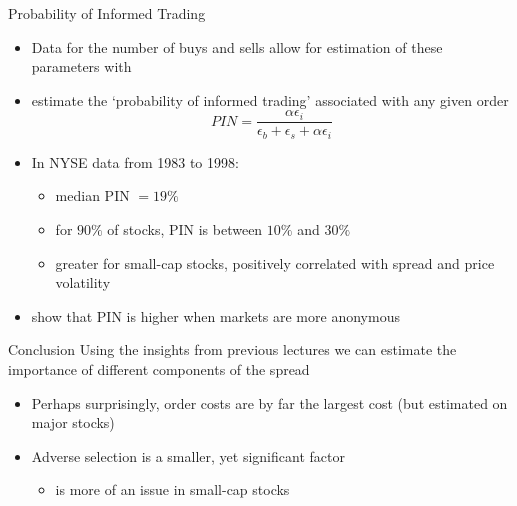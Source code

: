 \documentclass[english,10pt
,aspectratio=169
]{beamer}
\begin{document}
\begin{frame}{Probability of Informed Trading}
	\begin{itemize}
		\item Data for the number of buys and sells allow for estimation of these parameters with 
		\item \textbf{\citet*{easley_is_2002}} estimate the `probability of informed trading' associated with any given order
		\begin{equation} \tag{5.27}
		PIN = \frac{\alpha \epsilon_i}{\epsilon_b + \epsilon_s + \alpha \epsilon_i}
		\end{equation}
		\item In NYSE data from 1983 to 1998:
		\begin{itemize}
			\item median PIN $=19\%$
			\item for $90\%$ of stocks, PIN is between $10\%$ and $30\%$
			\item greater for small-cap stocks, positively correlated with spread and price volatility
		\end{itemize}
		\item \textbf{\citet*{grammig_knowing_2001}} show that PIN is higher when markets are more anonymous
	\end{itemize}
\end{frame}


\begin{frame}{Conclusion}
	Using the insights from previous lectures we can estimate the importance of different components of the spread
	\begin{itemize}
		\item Perhaps surprisingly, order costs are by far the largest cost (but estimated on major stocks)
		\item Adverse selection is a smaller, yet significant factor 
		\begin{itemize}
			\item is more of an issue in small-cap stocks
		\end{itemize}
	\end{itemize}
\end{frame}
\end{document}
